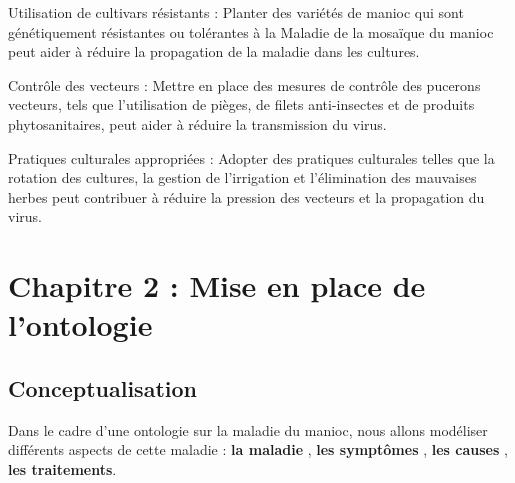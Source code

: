 \documentclass{article}
\begin{document}
\begin{itemize}
		\textemdash  Utilisation de cultivars résistants : Planter des variétés de manioc qui sont génétiquement résistantes ou tolérantes à la Maladie de la mosaïque du manioc peut aider à réduire la propagation de la maladie dans les cultures.
		
		\textemdash  Contrôle des vecteurs : Mettre en place des mesures de contrôle des pucerons vecteurs, tels que l'utilisation de pièges, de filets anti-insectes et de produits phytosanitaires, peut aider à réduire la transmission du virus.
		
		\textemdash  Pratiques culturales appropriées : Adopter des pratiques culturales telles que la rotation des cultures, la gestion de l'irrigation et l'élimination des mauvaises herbes peut contribuer à réduire la pression des vecteurs et la propagation du virus.
	\end{itemize}

	\section{Chapitre 2 : Mise en place de l'ontologie}
	\subsection{Conceptualisation}
	\quad Dans le cadre d'une ontologie sur la maladie du manioc, nous allons modéliser différents aspects de cette maladie : \textbf{la maladie} , \textbf{les symptômes} , \textbf{les causes} , \textbf{les traitements}.
	
\end{document}
